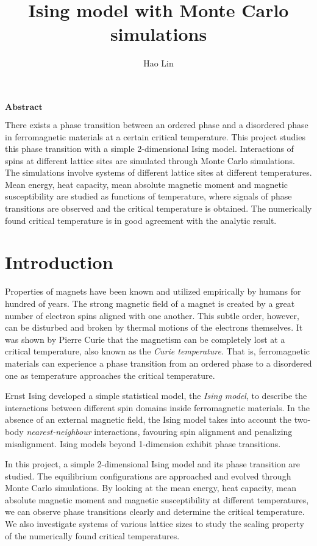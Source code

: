 \documentclass{article}
\begin{document}
\title{Ising model with Monte Carlo simulations}
\author{Hao Lin}
\maketitle


\begin{center}
\small
$\mathbf{Abstract}$
\end{center}
{\small
There exists a phase transition between an ordered phase and a disordered phase in ferromagnetic materials at a certain critical temperature. This project studies this phase transition with a simple 2-dimensional Ising model. Interactions of spins at different lattice sites are simulated through Monte Carlo simulations. The simulations involve systems of different lattice sites at different temperatures. Mean energy, heat capacity, mean absolute magnetic moment and magnetic susceptibility are studied as functions of temperature, where signals of phase transitions are observed and the critical temperature is obtained. The numerically found critical temperature is in good agreement with the analytic result.
}

\section{Introduction}
Properties of magnets have been known and utilized empirically by humans for hundred of years. The strong magnetic field of a magnet is created by a great number of electron spins aligned with one another. This subtle order, however, can be disturbed and broken by thermal motions of the electrons themselves. It was shown by Pierre Curie that the magnetism can be completely lost at a critical temperature, also known as the \emph{Curie temperature}. That is, ferromagnetic materials can experience a phase transition from an ordered phase to a disordered one as temperature approaches the critical temperature. 

Ernst Ising developed a simple statistical model, the \emph{Ising model}, to describe the interactions between different spin domains inside ferromagnetic materials.\cite{textbook} In the absence of an external magnetic field, the Ising model takes into account the two-body \emph{nearest-neighbour} interactions, favouring spin alignment and penalizing misalignment. Ising models beyond 1-dimension exhibit phase transitions.\cite{video} 

In this project, a simple 2-dimensional Ising model and its phase transition are studied. The equilibrium configurations are approached and evolved through Monte Carlo simulations. By looking at the mean energy, heat capacity, mean absolute magnetic moment and magnetic susceptibility at different temperatures, we can observe phase transitions clearly and determine the critical temperature. We also investigate systems of various lattice sizes to study the scaling property of the numerically found critical temperatures.
\end{document}
